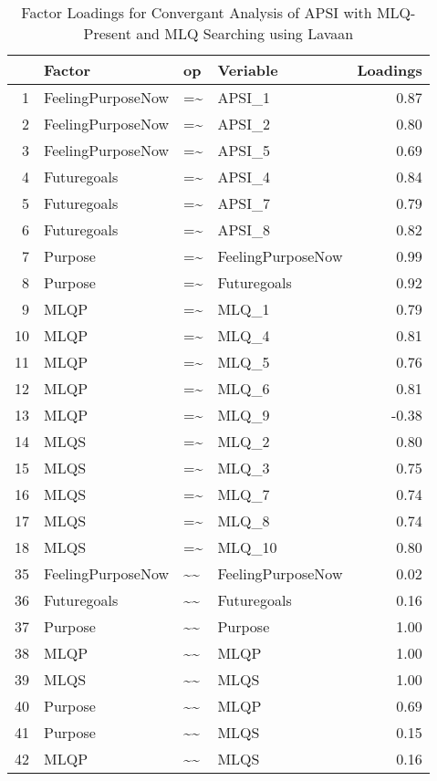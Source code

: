 \documentclass{article}\usepackage[]{graphicx}\usepackage[]{color}
\begin{document}
\begin{table}[ht]
\centering
\begin{tabular}{rlllr}
  \hline
 & Factor & op & Veriable & Loadings \\ 
  \hline
1 & FeelingPurposeNow & =\~{} & APSI\_1 & 0.87 \\ 
  2 & FeelingPurposeNow & =\~{} & APSI\_2 & 0.80 \\ 
  3 & FeelingPurposeNow & =\~{} & APSI\_5 & 0.69 \\ 
  4 & Futuregoals & =\~{} & APSI\_4 & 0.84 \\ 
  5 & Futuregoals & =\~{} & APSI\_7 & 0.79 \\ 
  6 & Futuregoals & =\~{} & APSI\_8 & 0.82 \\ 
  7 & Purpose & =\~{} & FeelingPurposeNow & 0.99 \\ 
  8 & Purpose & =\~{} & Futuregoals & 0.92 \\ 
  9 & MLQP & =\~{} & MLQ\_1 & 0.79 \\ 
  10 & MLQP & =\~{} & MLQ\_4 & 0.81 \\ 
  11 & MLQP & =\~{} & MLQ\_5 & 0.76 \\ 
  12 & MLQP & =\~{} & MLQ\_6 & 0.81 \\ 
  13 & MLQP & =\~{} & MLQ\_9 & -0.38 \\ 
  14 & MLQS & =\~{} & MLQ\_2 & 0.80 \\ 
  15 & MLQS & =\~{} & MLQ\_3 & 0.75 \\ 
  16 & MLQS & =\~{} & MLQ\_7 & 0.74 \\ 
  17 & MLQS & =\~{} & MLQ\_8 & 0.74 \\ 
  18 & MLQS & =\~{} & MLQ\_10 & 0.80 \\ 
  35 & FeelingPurposeNow & \~{}\~{} & FeelingPurposeNow & 0.02 \\ 
  36 & Futuregoals & \~{}\~{} & Futuregoals & 0.16 \\ 
  37 & Purpose & \~{}\~{} & Purpose & 1.00 \\ 
  38 & MLQP & \~{}\~{} & MLQP & 1.00 \\ 
  39 & MLQS & \~{}\~{} & MLQS & 1.00 \\ 
  40 & Purpose & \~{}\~{} & MLQP & 0.69 \\ 
  41 & Purpose & \~{}\~{} & MLQS & 0.15 \\ 
  42 & MLQP & \~{}\~{} & MLQS & 0.16 \\ 
   \hline
\end{tabular}
\caption{Factor Loadings for Convergant Analysis of APSI with MLQ-Present and MLQ Searching using Lavaan} 
\end{table}
\end{document}
